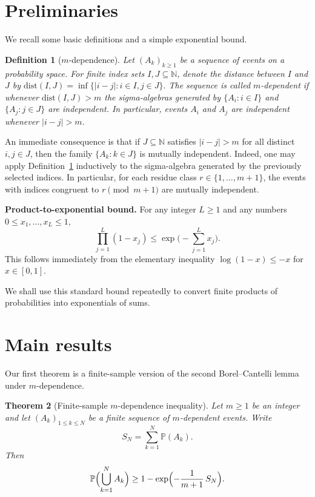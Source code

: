 \documentclass[11pt]{article}
\newtheorem{theorem}{Theorem}
\newtheorem{definition}[theorem]{Definition}
\begin{document}
\section{Preliminaries}
We recall some basic definitions and a simple exponential bound.

\begin{definition}[\boldmath$m$-dependence]
\label{def:mdep}
Let $(A_k)_{k\ge1}$ be a sequence of events on a probability space.
For finite index sets $I,J\subseteq\mathbb{N}$, denote the distance
between $I$ and $J$ by \(\mathrm{dist}(I,J)=\inf\{|i-j|:i\in I,
j\in J\}.\)  The sequence is called $m$-dependent if whenever
\(\mathrm{dist}(I,J)>m\) the sigma-algebras generated by
\(\{A_i:i\in I\}\) and \(\{A_j:j\in J\}\) are independent.  In
particular, events $A_i$ and $A_j$ are independent whenever
\(|i-j|>m\).
\end{definition}

An immediate consequence is that if \(J\subseteq\mathbb{N}\) satisfies
\(|i-j|>m\) for all distinct \(i,j\in J\), then the family
\(\{A_k:k\in J\}\) is mutually independent.  Indeed, one may apply
Definition~\ref{def:mdep} inductively to the sigma-algebra generated by
the previously selected indices.  In particular, for each residue class
\(r\in\{1,\dots,m+1\}\), the events with indices congruent to
\(r\pmod{m+1}\) are mutually independent.

\medskip
\noindent\textbf{Product-to-exponential bound.}
For any integer \(L\ge1\) and any numbers \(0\le x_1,\dots,x_L\le1\),
\[
  \prod_{j=1}^L (1 - x_j) \leq \exp\bigl(-\sum_{j=1}^L x_j\bigr).
\]
This follows immediately from the elementary inequality
\(\log(1-x)\le -x\) for \(x\in[0,1]\).

We shall use this standard bound repeatedly to convert finite products
of probabilities into exponentials of sums.

\section{Main results}

Our first theorem is a finite-sample version of the second
Borel--Cantelli lemma under $m$-dependence.

\begin{theorem}[Finite-sample $m$-dependence inequality]
\label{thm:finite}
Let $m\ge 1$ be an integer and let $(A_k)_{1\le k\le N}$ be a finite
sequence of $m$-dependent events.  Write
\[
  S_N=\sum_{k=1}^{N} \mathbb{P}(A_k).
\]
Then
\[
  \mathbb{P}\Bigl(\bigcup_{k=1}^N A_k\Bigr)
  \ge 1 - \exp\Bigl(- \frac{1}{m+1}\,S_N\Bigr).
\]
\end{theorem}
\end{document}
